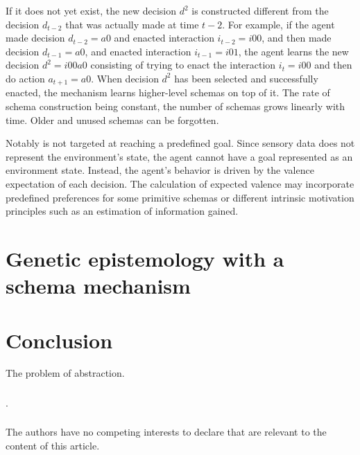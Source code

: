 \documentclass[runningheads]{llncs}
\begin{document}
If it does not yet exist, the new decision $d^2$ is constructed different from the decision $d_{t-2}$ that was actually made at time $t-2$. 
For example, if the agent made decision $d_{t-2} = a0$ and enacted interaction $i_{t-2}=i00$, and then made decision $d_{t-1} = a0$, and enacted interaction $i_{t-1}=i01$, the agent learns the new decision $d^2=i00a0$ consisting of trying to enact the interaction $i_t=i00$ and then do action $a_{t+1}=a0$. 
When decision $d^2$ has been selected and successfully enacted, the mechanism learns higher-level schemas on top of it. 
The rate of schema construction being constant, the number of schemas grows linearly with time. 
Older and unused schemas can be forgotten.

Notably is not targeted at reaching a predefined goal. Since sensory data does not represent the environment's state, the agent cannot have a goal represented as an environment state. Instead, the agent's behavior is driven by the valence expectation of each decision. 
The calculation of expected valence may incorporate predefined preferences for some primitive schemas or different intrinsic motivation principles such as an estimation of information gained. 

\section{Genetic epistemology with a schema mechanism}



\section{Conclusion}

The problem of abstraction. 


\begin{credits}
\subsubsection{\ackname} .

\subsubsection{\discintname}
The authors have no competing interests to declare that are
relevant to the content of this article.
\end{credits}
%
%
%


%
\end{document}
